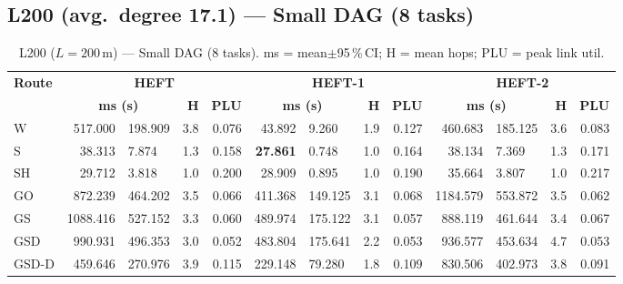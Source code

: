 \documentclass[11pt]{article}
\newcommand{\win}[1]{\textcolor{green!50!black}{\textbf{#1}}}
\newcommand{\bad}[1]{\textcolor{red!70!black}{#1}}
\begin{document}
\subsection{L200 (avg.\ degree 17.1) --- Small DAG (8 tasks)}
\begin{table}[H]\centering\small
\begin{tabular}{l r@{$\pm$}l r r r@{$\pm$}l r r r@{$\pm$}l r r}
\toprule
\textbf{Route} & \multicolumn{4}{c}{\textbf{HEFT}} & \multicolumn{4}{c}{\textbf{HEFT-1}} & \multicolumn{4}{c}{\textbf{HEFT-2}} \\
\cmidrule(lr){2-5}\cmidrule(lr){6-9}\cmidrule(lr){10-13}
& \multicolumn{2}{c}{\textbf{ms (s)}} & \textbf{H} & \textbf{PLU}& \multicolumn{2}{c}{\textbf{ms (s)}} & \textbf{H} & \textbf{PLU}& \multicolumn{2}{c}{\textbf{ms (s)}} & \textbf{H} & \textbf{PLU} \\
\midrule
  W & 517.000 & 198.909 & 3.8 & 0.076 & 43.892 & 9.260 & 1.9 & 0.127 & 460.683 & 185.125 & 3.6 & 0.083 \\
  S & 38.313 & 7.874 & 1.3 & 0.158 & \win{27.861} & 0.748 & 1.0 & 0.164 & 38.134 & 7.369 & 1.3 & 0.171 \\
  SH & 29.712 & 3.818 & 1.0 & 0.200 & 28.909 & 0.895 & 1.0 & 0.190 & 35.664 & 3.807 & 1.0 & 0.217 \\
  GO & 872.239 & 464.202 & 3.5 & 0.066 & 411.368 & 149.125 & 3.1 & 0.068 & \bad{1184.579} & 553.872 & 3.5 & 0.062 \\
  GS & \bad{1088.416} & 527.152 & 3.3 & 0.060 & \bad{489.974} & 175.122 & 3.1 & 0.057 & 888.119 & 461.644 & 3.4 & 0.067 \\
  GSD & 990.931 & 496.353 & 3.0 & 0.052 & 483.804 & 175.641 & 2.2 & 0.053 & 936.577 & 453.634 & 4.7 & 0.053 \\
  GSD-D & 459.646 & 270.976 & 3.9 & 0.115 & 229.148 & 79.280 & 1.8 & 0.109 & 830.506 & 402.973 & 3.8 & 0.091 \\
\bottomrule\end{tabular}
\caption{L200 ($L=200$\,m) --- Small DAG (8 tasks). ms = mean$\pm$95\,\%\,CI; H = mean hops; PLU = peak link util.}
\end{table}
\end{document}
